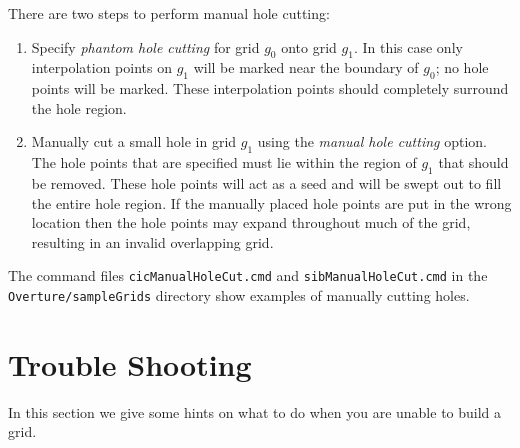 \documentclass[xcolor=rgb,svgnames,dvipsnames]{article}
\begin{document}
There are two steps to perform manual hole cutting:
\begin{enumerate}
  \item Specify {\em phantom hole cutting} for grid $g_0$ onto grid $g_1$. In this case only
    interpolation points on $g_1$ will be marked near the boundary of $g_0$; no hole points
    will be marked. These interpolation points should completely surround the hole region.
  \item Manually cut a small hole in grid $g_1$ using the {\em manual hole cutting} option.
      The hole points that are specified must lie within the region of $g_1$ that should be
     removed. These hole points will act as a seed and will be swept out to fill the entire hole region.
     If the manually placed hole points are put in the wrong location then the hole points may
     expand throughout much of the grid, resulting in an invalid overlapping grid.
\end{enumerate}
The command files {\tt cicManualHoleCut.cmd} and {\tt sibManualHoleCut.cmd} in the
{\tt Overture/sampleGrids} directory show examples of manually cutting holes.



% 
% 
% 


\clearpage
\section{Trouble Shooting}

   In this section we give some hints on what to do when you are unable to build a grid.
\end{document}
